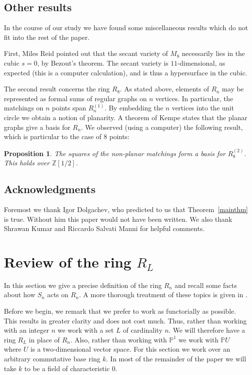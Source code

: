 \documentclass{amsart}
\newtheorem{proposition}[theorem]{Proposition}
\theoremstyle{definition}
\theoremstyle{remark}
\def\Z{\mathbb{Z}}
\def\P{\mathbb{P}}
\begin{document}
\subsection{Other results}

In the course of our study we have found some miscellaneous results which
do not fit into the rest of the paper.

First, Miles Reid pointed out that the secant variety of $M_8$ necessarily
lies in the cubic $s=0$, by Bezout's theorem.  The secant variety is
$11$-dimensional, as expected (this is a computer calculation), and is thus
a hypersurface in the cubic.

The second result concerns the ring $R_8$.  As stated above, elements of $R_n$
may be represented as formal sums of regular graphs on $n$ vertices.  In
particular, the matchings on $n$ points span $R_n^{(1)}$.  By embedding
the $n$ vertices into the unit circle we obtain a notion of planarity.
A theorem of Kempe states that the planar graphs give a basis for $R_n$.  We
observed (using a computer) the following result, which is particular to
the case of 8 points:

\begin{proposition}
The squares of the non-planar matchings form a basis for $R_8^{(2)}$.  This
holds over $\Z[1/2]$.
\end{proposition}


\subsection{Acknowledgments}
Foremost we thank Igor Dolgachev, who predicted to us that
Theorem~\ref{mainthm} is true.  Without him this paper would not have
been written.  We also thank Shrawan Kumar and Riccardo Salvati Manni
for helpful comments.


\section{Review of the ring $R_L$}
\label{s-review}

In this section we give a precise definition of the ring $R_n$ and recall
some facts about how $S_n$ acts on $R_n$.  A more thorough treatment of these
topics is given in \cite{HMSV}.

Before we begin, we remark that we prefer to work as functorially as possible.
This results in  greater clarity and does not cost
much.  Thus, rather than working with an integer $n$ we work with a set $L$
of cardinality $n$.  We will therefore have a ring $R_L$ in place of $R_n$.
Also, rather than working with $\P^1$ we work with $\P{U}$ where $U$ is a
two-dimensional vector space.  For this section we work over an arbitrary
commutative base ring $k$.  In most of the remainder of the paper we will
take $k$ to be a field of characteristic $0$.
\end{document}
